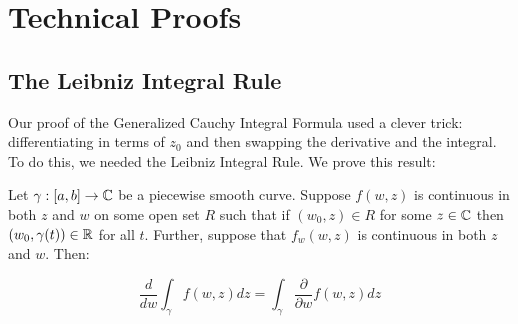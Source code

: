 \chapter{Technical Proofs}

\section{The Leibniz Integral Rule}

Our proof of the Generalized Cauchy Integral Formula used a clever trick: differentiating in terms of $z_0$ and then swapping the derivative and the integral. To do this, we needed the Leibniz Integral Rule. We prove this result:

\begin{lem} Let $\gamma:[a,b]\rightarrow\mathbb{C}$ be a piecewise smooth curve. Suppose $f(w,z)$ is continuous in both $z$ and $w$ on some open set $R$ such that if $(w_0,z) \in R$ for some $z\in\mathbb{C}$ then $(w_0,\gamma(t))\in\mathbb{R}$ for all $t$. Further, suppose that $f_w(w,z)$ is continuous in both $z$ and $w$. Then:

$$\frac{d}{dw} \int_{\gamma} f(w,z)dz = \int_{\gamma} \frac{\partial}{\partial w} f(w,z)dz$$
\end{lem}

